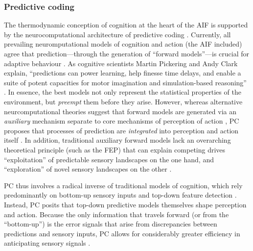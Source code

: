 \begin{CJK}{UTF8}{gbsn}
  \subsubsection{Predictive coding\label{sect:predictiveCoding}}
The thermodynamic conception of cognition at the heart of the AIF is supported by the neurocomputational architecture of predictive coding  \citep[hereafter PC, see][]{Rao1999,Clark2013}.  Currently, all prevailing neuromputational models of cognition and action (the AIF included) agree that prediction---through the generation of ``forward models''---is crucial for adaptive behaviour \citep{Wolpert2003,Clark2013}.  As cognitive scientists Martin Pickering and Andy Clark explain, ``predictions can power learning, help finesse time delays, and enable a suite of potent capacities for motor imagination and simulation-based reasoning'' \citep[6]{Pickering2014}.  In essence, the best models not only represent the statistical properties of the environment, but \textit{preempt} them before they arise.
However, whereas alternative neurcomputational theories suggest that forward models are generated via an \textit{auxiliary} mechanism separate to core mechanisms of perception of action \citep{Wolpert1997}, PC proposes that processes of prediction are \textit{integrated} into perception and action itself \citep[for a more detailed review of Auxiliary Forward Models and Integrative Forward Models, see Appendix ~\ref{app2:theory}, Section ~\ref{app2:motorControl};][]{Pickering2014}.  In addition, traditional auxiliary forward models lack an overarching theoretical principle (such as the FEP) that can explain competing drives ``exploitation'' of predictable sensory landscapes on the one hand, and ``exploration'' of novel sensory landscapes on the other \citep[also known as the dark room dilemma, explained in detail below in Section ~\ref{sect:surprise}]{Clark2013}.

PC thus involves a radical inverse of traditional models of cognition, which rely predominantly on bottom-up sensory inputs and top-down feature detection \citep[e.g.,][]{Marr1985}. Instead, PC posits that top-down predictive models themselves shape perception and action.  Because the only information that travels forward (or from the ``bottom-up'') is the error signals that arise from discrepancies between predictions and sensory inputs, PC allows for considerably greater efficiency in anticipating sensory signals \citep[for a more detailed explanation of the PC paradigm, including its origins as a favourable data compression strategy, see Appendix~\ref{app2:theory} Section ~\ref{app2:predictiveCoding}][]{Pickering2014}.


\end{CJK}
